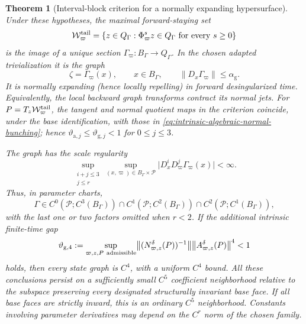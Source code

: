 \documentclass[11pt]{amsart}
\numberwithin{equation}{section}
\newtheorem{theorem}{Theorem}[section]
\theoremstyle{definition}
\theoremstyle{remark}
\begin{document}
\begin{theorem}[Interval-block criterion for a normally expanding
hypersurface]
Under these hypotheses, the
maximal forward-staying set
\begin{equation}\label{eq:maximal-forward-staying-set}
 \mathcal W^{\rm tail}_\varpi
 =\{z\in Q_\Gamma:\Phi^s_\varpi z\in Q_\Gamma
       \text{ for every }s\ge0\}
\end{equation}
is the image of a unique section $\Gamma_\varpi:B_\Gamma\to Q_\Gamma$.
In the chosen adapted trivialization it is the graph
\begin{equation}\label{eq:parameterized-algebraic-graph}
 \zeta=\Gamma_\varpi(x),\qquad x\in B_\Gamma,\qquad
 \|D_x\Gamma_\varpi\|\le\alpha_{\mathrm g}.
\end{equation}
It is normally expanding (hence locally repelling) in forward
desingularized time.  Equivalently,
the local backward graph transforms contract its normal jets.
For $P=T_z\mathcal W^{\rm tail}_\varpi$, the tangent and normal quotient
maps in the criterion coincide, under the base identification, with
those in \eqref{eq:intrinsic-algebraic-normal-bunching}; hence
$\vartheta_{\mathrm a,j}\le\vartheta_{\mathrm g,j}<1$ for
$0\le j\le3$.

The graph has the scale regularity
\begin{equation}\label{eq:algebraic-graph-scale-regularity}
 \sup_{\substack{i+j\le3\\j\le r}}
 \sup_{(x,\varpi)\in B_\Gamma\times\mathcal P}
 \bigl|D_x^iD_\varpi^j\Gamma_\varpi(x)\bigr|<\infty.
\end{equation}
Thus, in parameter charts,
\begin{equation}\label{eq:algebraic-graph-scale-spaces}
 \Gamma\in C^0(\mathcal P;C^3(B_\Gamma))
 \cap C^1(\mathcal P;C^2(B_\Gamma))
 \cap C^2(\mathcal P;C^1(B_\Gamma)),
\end{equation}
with the last one or two factors omitted when $r<2$.  If the additional
intrinsic finite-time gap
\begin{equation}\label{eq:alg-fourth-rate-gap}
 \vartheta_{\mathrm g,4}:=
 \sup_{\varpi,z,P\ {\rm admissible}}
                 \bigl\|(N^\delta_{\varpi,z}(P))^{-1}\bigr\|
                 \bigl\|A^\delta_{\varpi,z}(P)\bigr\|^4<1
\end{equation}
holds, then every state graph is $C^4$, with a uniform $C^4$ bound.  All
these conclusions persist on a sufficiently small $C^5$ coefficient
neighborhood relative to the subspace preserving every designated
structurally invariant base face.  If all base faces are strictly inward,
this is an ordinary $C^5$ neighborhood.  Constants involving parameter
derivatives may depend on the $C^r$ norm of the chosen family.
\end{theorem}
\end{document}
